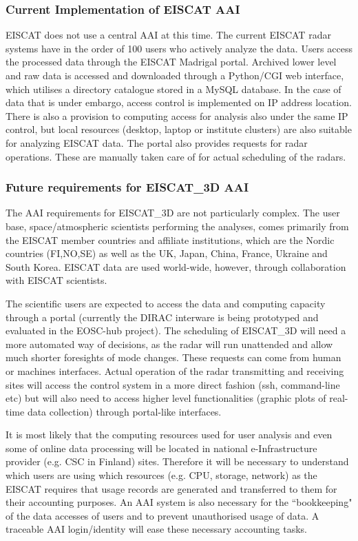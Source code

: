 \documentclass[fleqn,10pt]{wlscirep}
\begin{document}
{\subsubsection{Current Implementation of EISCAT AAI}
EISCAT does not use a central AAI at this time. The current EISCAT radar systems have in the order of 100 users who actively analyze the data. Users access the processed data through the EISCAT Madrigal portal\cite{madrigal}. Archived lower level and raw data is accessed and downloaded through a Python/CGI web interface, which utilises a directory catalogue stored in a MySQL database. In the case of data that is under embargo, access control is implemented on IP address location. There is also a provision to computing access for analysis also under the same IP control, but local resources (desktop, laptop or institute clusters) are also suitable for analyzing EISCAT data. The portal also provides requests for radar operations. These are manually taken care of for actual scheduling of the radars.

\subsubsection{Future requirements for EISCAT\_3D AAI}
The AAI requirements for EISCAT\_3D are not particularly complex. The user base, space/atmospheric scientists performing the analyses, comes primarily from the EISCAT member countries and affiliate institutions, which are the Nordic countries (FI,NO,SE) as well as the UK, Japan, China, France, Ukraine and South Korea. EISCAT data are used world-wide, however, through collaboration with EISCAT scientists.

The scientific users are expected to access the data and computing capacity through a portal (currently the DIRAC interware is being prototyped and evaluated in the EOSC-hub project). The scheduling of EISCAT\_3D will need a more automated way of decisions, as the radar will run unattended and allow much shorter foresights of mode changes. These requests can come from human or machines interfaces. Actual operation of the radar transmitting and receiving sites will access the control system in a more direct fashion (ssh, command-line etc) but will also need to access higher level functionalities (graphic plots of real-time data collection) through portal-like interfaces.

It is most likely that the computing resources used for user analysis and even some of online data processing will be located in national e-Infrastructure provider (e.g. CSC in Finland) sites. 
Therefore it will be necessary to understand which users are using which resources (e.g. CPU, storage, network) as the EISCAT requires that usage records are generated and transferred to them for their accounting purposes. An AAI system is also necessary for the ``bookkeeping" of the data accesses of users and to prevent unauthorised usage of data. A traceable AAI login/identity will ease these necessary accounting tasks.

}
\end{document}
